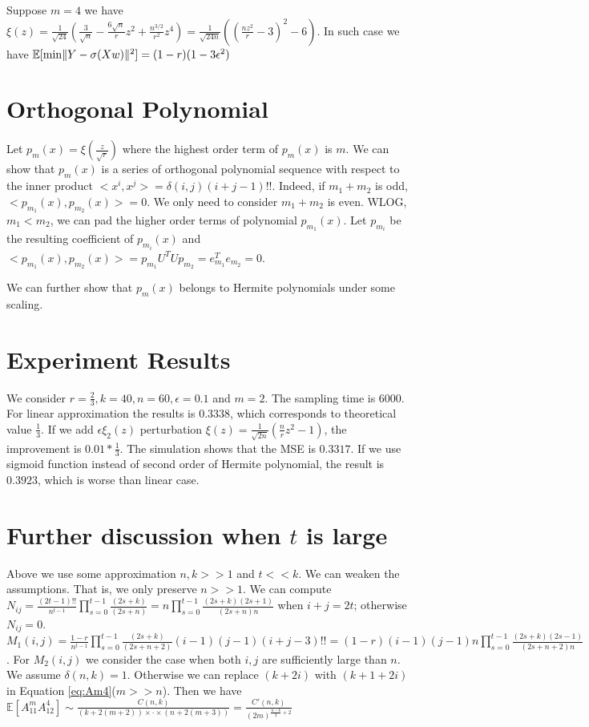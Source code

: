 \documentclass{article}
\DeclarePairedDelimiter\norm{\lVert}{\rVert}
\def\E{\mathbb{E}}
\begin{document}
Suppose  $ m = 4$ we have $ \xi(z) =
\frac{1}{\sqrt{24}}(\frac{3}{\sqrt{n}} - \frac{6\sqrt{n}}{r} z^2 +
\frac{n^{3/2}}{r^2}z^4)  = \frac{1}{\sqrt{24n}}((\frac{nz^2}{r} - 3)^2 - 6)$.
In such case we have $\E[\min \norm{Y - \sigma(Xw)}^2]=(1-r)(1-3\epsilon^2)$
\section{Orthogonal Polynomial}
Let $p_m(x) = \xi(\frac{z}{\sqrt{r}})$
where the highest order term of $p_m(x)$ is $m$.
We can show that $p_m(x)$ is a series of orthogonal polynomial sequence
with respect to the inner product
$<x^i, x^j> = \delta(i,j)(i+j-1)!!$.
Indeed, if $m_1 + m_2$ is odd, $<p_{m_1}(x), p_{m_2}(x)> = 0$.
We only need to consider $m_1 + m_2$ is even. WLOG, $m_1 < m_2$,
we can pad the higher order terms of polynomial $p_{m_1}(x)$.
Let $p_{m_i}$ be the resulting coefficient of $p_{m_i}(x)$
and $<p_{m_1}(x), p_{m_2}(x)> = p_{m_1}U^TUp_{m_2} = e^T_{m_1} e_{m_2} = 0$.

We can further show that $p_m(x)$ belongs to Hermite polynomials
under some scaling.

\section{Experiment Results}
We consider $r=\frac{2}{3}, k=40, n=60, \epsilon=0.1$ and $m=2$.
The sampling time is 6000.
For linear approximation the results is $0.3338$,
which corresponds to theoretical value $\frac{1}{3}$.
If we add $\epsilon \xi_2(z)$ perturbation
$\xi(z) = \frac{1}{\sqrt{2n}}(\frac{n}{r} z^2 -1)$,
the improvement is $0.01 * \frac{1}{3}$.
The simulation shows that the MSE is $0.3317$.
If we use sigmoid function instead of second order of Hermite polynomial,
the result is $0.3923$, which is worse than linear case.

\section{Further discussion when $t$ is large}
Above we use some approximation $n, k >> 1$ and $ t << k$.
We can weaken the assumptions. That is, we only preserve $ n >> 1$.
We can compute $N_{ij} =\frac{(2t-1)!!}{n^{t-1}} \prod_{s=0}^{t-1}
\frac{(2s+k)}{(2s+n)} = n
\prod_{s=0}^{t-1} \frac{(2s+k)(2s+1)}{(2s+n)n}$ 
when $i+j = 2t$; otherwise $N_{ij}=0$.
$M_1(i, j)=\frac{1-r}{n^{t-1}} \prod_{s=0}^{t-1}
\frac{(2s+k)}{(2s+n+2)} (i-1)(j-1) (i+j-3)!! =
(1-r)(i-1)(j-1)n \prod_{s=0}^{t-1} \frac{(2s+k)(2s-1)}{(2s+n+2)n}$. For $M_2(i, j)$
we consider the case when both $i, j$ are sufficiently large than $n$. We assume $\delta(n, k) = 1$.
Otherwise we can replace $(k+2i)$ with $(k+1+2i)$ in Equation \eqref{eq:Am4}($m>>n$). Then
we have $\E[A_{11}^m A_{12}^4] \sim \frac{C(n,k)}{(k+2(m+2)) \times \cdot\times (n+2(m+3)) } = \frac{C'(n,k)}{(2m)^{\frac{n-k}{2}+2}}$
\end{document}
